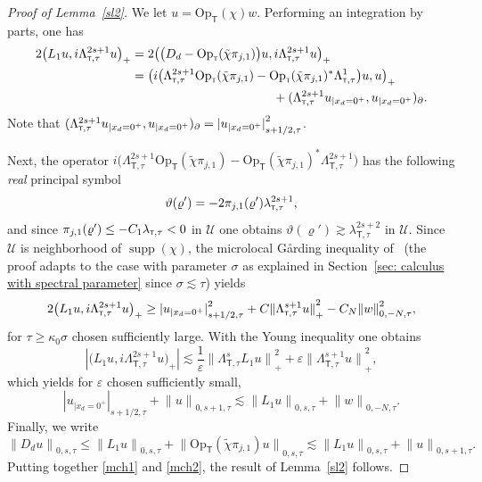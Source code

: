 \documentclass[10pt]{amsart}
\theoremstyle{plain}
\theoremstyle{definition}
\newcommand{\nhd}{neighborhood\xspace}
\newcommand{\suff}{sufficiently\xspace}
\let\k\kappa
\let\y\varrho
\newcommand{\tchi}{\tilde{\chi}}
\let \Re \relax
\DeclareMathOperator{\Re}{Re}
\let \Im \relax
\DeclareMathOperator{\Im}{Im}
\newcommand{\inp}[2]{(#1, #2)}
\newcommand{\biginp}[2]{\big(#1, #2 \big)}
\newcommand{\U}{\mathscr U}
\newcommand{\br}{\ensuremath{_{|x_d=0^+}}}
\newcommand{\Opt}{\ensuremath{\mathrm{Op}_{\scriptscriptstyle{\mathsf{T}}}}}
\newcommand{\Norm}[2]{{\| #1 \|}_{#2}}
\newcommand{\Normsc}[2]{{\| #1 \|}_{#2, \tau}}
\newcommand{\normsc}[2]{{| #1 |}_{#2, \tau}}
\newcommand{\lsct}{\lambda_{{\scriptscriptstyle{\mathsf T}},\tau}}
\newcommand{\Lsct}{\Lambda_{{\scriptscriptstyle{\mathsf T}},\tau}}
\DeclareMathOperator{\supp}{supp}
\begin{document}
\begin{proof}[Proof of Lemma~\ref{sl2}]
We let $u=\Opt(\chi)w$. Performing an integration by parts, one has
\begin{align*}
2\Re\biginp{L_1 u}{i\Lsct^{2s+1} u}_+
& = 2\Re\biginp{ \big(D_d-\Opt(\tchi\pi_{j,1})\big)u} {i\Lsct^{2s+1} u}_+\\
&= \Re \biginp{i
\big(\Lsct^{2s+1}\Opt(\tchi\pi_{j,1})-\Opt(\tchi\pi_{j,1})^*\Lsct^1\big)u
}{u}_+\\
&\hspace*{4cm} + \Re\inp{\Lsct^{2s+1}u\br}{u\br}_{\partial}.
\end{align*}
Note that
$\Re\inp{\Lsct^{2s+1}u\br}{u\br}_{\partial}
= \normsc{u\br}{s+1/2}^2$.

Next, the operator
$i \big(\Lsct^{2s+1}\Opt(\tchi\pi_{j,1})-\Opt(\tchi\pi_{j,1})^*\Lsct^{2s+1}\big) $
has the following \emph{real} principal symbol
\begin{equation*}
\vartheta(\y')=-2\Im\pi_{j,1}(\y')\lsct^{2s+1},
\end{equation*}
and since $\Im\pi_{j,1}(\y') \leq - C_1 \lsct <0$ in $\U$ one obtains
$\vartheta(\y')\gtrsim\lsct^{2s+2}$ in $\U$. Since~$\U$ is \nhd of
$\supp(\chi)$, the microlocal G{\aa}rding inequality of~\cite[Th.\,2.49]{JGL-vol1} (the proof adapts to the case with parameter $\sigma$ as
explained in Section~\ref{sec: calculus with spectral parameter} since $\sigma
\lesssim \tau$) yields
\begin{equation*}
2\Re\biginp{L_1 u}{i\Lsct^{2s+1} u}_+
\geq \normsc{u\br}{s+1/2}^2
+C\Norm{\Lsct^{s+1}u}{+}^2
-C_N\Normsc{w}{0,-N}^2,
\end{equation*}
for $\tau\geq \k_0\sigma$ chosen \suff
large.
With the Young inequality one obtains
\begin{equation*}
|\biginp{L_1 u}{i\Lsct^{2s+1} u}_+|
\lesssim \frac{1}{\varepsilon} \Norm{\Lsct^s L_1 u}{+}^2
+\varepsilon
\Norm{\Lsct^{s+1} u}{+}^2,
\end{equation*}
which yields for $\varepsilon$ chosen \suff small,
\begin{equation}\label{mch1}
\normsc{u\br}{s+1/2}
+\Normsc{u}{0,s+1}
\lesssim \Normsc{ L_1 u}{0,s} +\Normsc{w}{0,-N}.
\end{equation}
Finally, we write
\begin{equation}\label{mch2}
\Normsc{D_du}{0,s} \leq
\Normsc{L_1 u}{0,s} + \Normsc{\Opt(\tchi \pi_{j,1}) u}{0,s}
\lesssim
\Normsc{L_1 u}{0,s} + \Normsc{u}{0,s+1}.
\end{equation}
Putting together \eqref{mch1} and \eqref{mch2}, the result of
Lemma~\ref{sl2} follows.
\end{proof}
\end{document}

